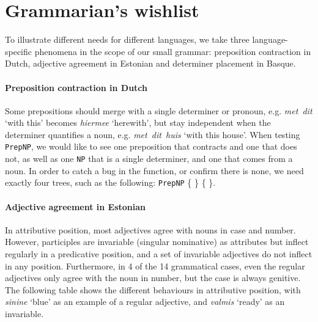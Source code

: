 \documentclass[11pt]{article}
\def\t#1{\texttt{#1}}
\begin{document}
\section{Grammarian's wishlist}

To illustrate different needs for different languages, we
take three language-specific phenomena in the scope of our
small grammar: preposition contraction in Dutch, adjective agreement
in Estonian and determiner placement in Basque.

\paragraph{Preposition contraction in Dutch} Some prepositions should
merge with a single determiner or pronoun, e.g. \emph{met~dit} `with
this' becomes \emph{hiermee} `herewith', but stay independent when the
determiner quantifies a noun, e.g. \emph{met~dit~huis} `with this
house'. 
When testing \t{PrepNP}, we would like to see one preposition that
contracts and one that does not, as well as one \t{NP} that is a
single determiner, and one that comes from a noun. In order to catch a
bug in the function, or confirm there is none, we need exactly four
trees, such as the following:
\t{PrepNP} \{  \} 
           \{  \}. 

\paragraph{Adjective agreement in Estonian} In attributive position,
most adjectives agree with nouns in case and number. However,
participles are invariable (singular nominative) as
attributes but inflect regularly in a predicative position, and a set
of invariable adjectives do not inflect in any position. Furthermore,
in 4 of the 14 grammatical cases, even the regular adjectives only
agree with the noun in number, but the case is always genitive.
The following table shows the different behaviours in attributive
position, with \emph{sinine} `blue' as an example of a regular
adjective, and \emph{valmis} `ready' as an invariable.
\end{document}
